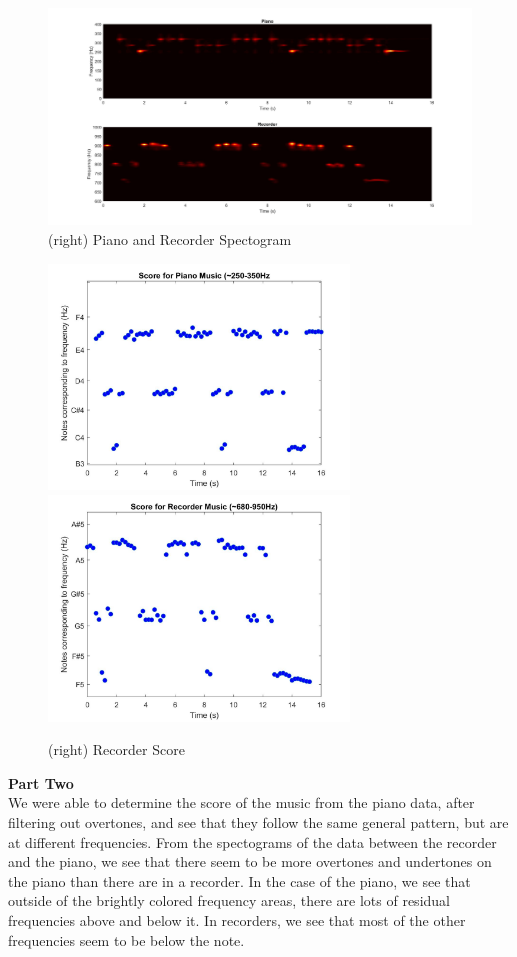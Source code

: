 \documentclass{article}
\begin{document}
\begin{figure}[h]
\begin{center}
\includegraphics[width = 16cm]{pianorecorder}
\caption{\label{fig:scaled_diss} (right) Piano and Recorder Spectogram}
\end{center}
\end{figure}

\begin{figure}[h]
\begin{center}
\includegraphics[width = 8cm]{piano}
\includegraphics[width = 8cm]{recorder}
\caption{\label{fig:scaled_diss} (left) Piano Score}
\caption{\label{fig:scaled_diss} (right) Recorder Score}
\end{center}
\end{figure}
\textbf{Part Two} \\
We were able to determine the score of the music from the piano data, after filtering out overtones, and see that they follow the same general pattern, but are at different frequencies. From the spectograms of the data between the recorder and the piano, we see that there seem to be more overtones and undertones on the piano than there are in a recorder. In the case of the piano, we see that outside of the brightly colored frequency areas, there are lots of residual frequencies above and below it. In recorders, we see that most of the other frequencies seem to be below the note. 
\end{document}
